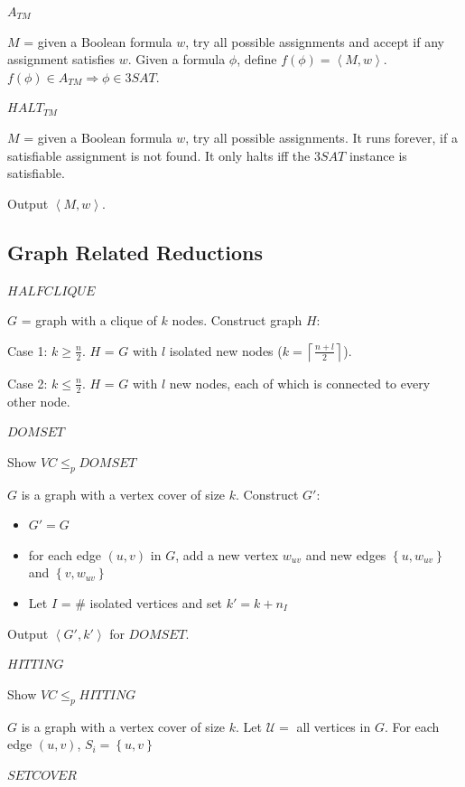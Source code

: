 \documentclass[10pt,landscape,a4paper]{article}
\newcommand{\set}[1]{\left \{ #1 \right \}}
\newcommand{\ceil}[1]{\left \lceil #1 \right \rceil}
\newcommand{\encoding}[1]{\left \langle #1 \right \rangle}
\begin{document}
\begin{multicols*}{3}
\underline{$A_{TM}$}

$M$ = given a Boolean formula $w$, try all possible assignments and accept if any assignment satisfies $w$. Given a formula $\phi$, define $f(\phi) = \encoding{M, w}$. $f(\phi) \in A_{TM} \Rightarrow \phi \in 3SAT$.

\underline{$HALT_{TM}$}

$M$ = given a Boolean formula $w$, try all possible assignments. It runs forever, if a satisfiable assignment is not found. It only halts iff the $3SAT$ instance is satisfiable.

Output $\encoding{M, w}$.

\subsection{Graph Related Reductions}

\underline{$HALFCLIQUE$}

$G$ = graph with a clique of $k$ nodes. Construct graph $H$:

Case 1: $k \geq \frac{n}{2}$. $H$ = $G$ with $l$ isolated new nodes ($k = \ceil{\frac{n + l}{2}}$).

Case 2: $k \leq \frac{n}{2}$. $H$ = $G$ with $l$ new nodes, each of which is connected to every other node.

\underline{$DOMSET$}

Show $VC \leq_p DOMSET$

$G$ is a graph with a vertex cover of size $k$. Construct $G'$:

\begin{itemize}
    \item $G' = G$
    \item for each edge $(u, v)$ in $G$, add a new vertex $w_{uv}$ and new edges $\set{u, w_{uv}}$ and $\set{v, w_{uv}}$
    \item Let $I$ = \# isolated vertices and set $k' = k + n_I$
\end{itemize}

Output $\encoding{G', k'}$ for $DOMSET$.

\underline{$HITTING$}

Show $VC \leq_p HITTING$

$G$ is a graph with a vertex cover of size $k$. Let $\mathcal{U} =$ all vertices in $G$. For each edge $(u, v)$, $S_i = \set{u, v}$

\underline{$SETCOVER$}


\end{multicols*}
\end{document}
